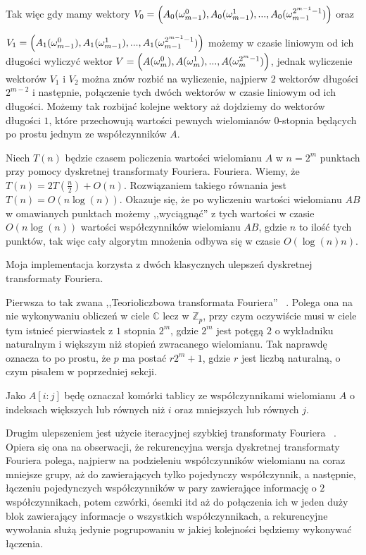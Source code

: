 \documentclass{article}
\begin{document}
Tak więc gdy mamy wektory $V_0=\Bigl( A_0(\omega_{m-1}^0),A_0(\omega_{m-1}^1),...,A_0(\omega_{m-1}^{2^{m-1}-1})\Bigr)$ oraz                          

$V_1=\Bigl( A_1(\omega_{m-1}^0),A_1(\omega_{m-1}^1),...,A_1(\omega_{m-1}^{2^{m-1}-1})\Bigr)$ możemy
w czasie liniowym od ich długości wyliczyć wektor $V=\Bigl( A(\omega_{m}^0),A(\omega_{m}^1),...,A(\omega_{m}^{2^{m}-1})\Bigr)$, jednak wyliczenie wektorów 
$V_1$ i $V_2$ można znów rozbić na wyliczenie, najpierw $2$ wektorów długości $2^{m-2}$ i 
następnie, połączenie tych dwóch wektorów w czasie liniowym od ich długości. Możemy tak rozbijać kolejne wektory aż dojdziemy do wektorów długości
$1$, które przechowują wartości pewnych wielomianów $0$-stopnia będących po prostu jednym ze współczynników $A$.

Niech $T(n)$ będzie czasem policzenia wartości wielomianu $A$ w $n=2^m$ punktach przy pomocy dyskretnej transformaty Fouriera. 
Fouriera. Wiemy, że $T(n)=2T(\frac{n}{2})+O(n)$. Rozwiązaniem takiego równania jest $T(n)=O(n\log(n))$.
Okazuje się, że po wyliczeniu wartości wielomianu $AB$ w omawianych punktach możemy ,,wyciągnąć'' z tych wartości w czasie
$O(n\log(n))$ wartości współczynników wielomianu $AB$, gdzie $n$ to ilość tych punktów, tak więc cały algorytm mnożenia odbywa się w czasie $O(\log(n)n)$.

Moja implementacja korzysta z dwóch klasycznych ulepszeń dyskretnej transformaty Fouriera. 

Pierwsza to tak zwana ,,Teorioliczbowa transformata Fouriera'' ~\cite{garg2017digital}. Polega ona na nie wykonywaniu obliczeń w ciele $\mathbb{C}$ lecz
w $\mathbb{Z}_p$, przy czym oczywiście musi w ciele tym istnieć pierwiastek z $1$ stopnia $2^m$, gdzie $2^m$ jest potęgą $2$ o wykładniku
naturalnym i większym niż stopień zwracanego wielomianu. 
Tak naprawdę oznacza to po prostu, że $p$ ma postać $r2^m+1$, gdzie $r$ jest liczbą naturalną, o czym pisałem w poprzedniej 
sekcji.

Jako $A[i:j]$ będę oznaczał komórki tablicy ze współczynnikami wielomianu $A$ o indeksach większych lub równych niż $i$ oraz mniejszych lub równych $j$. 


Drugim ulepszeniem jest użycie iteracyjnej szybkiej transformaty Fouriera ~\cite{wyrowski1988iterative}. Opiera się ona na obserwacji, że rekurencyjna wersja dyskretnej transformaty Fouriera 
polega, najpierw na podzieleniu współczynników wielomianu na coraz mniejsze grupy, aż do zawierających tylko pojedynczy współczynnik, a następnie, łączeniu pojedynczych współczynników
w pary zawierające informację o $2$ współczynnikach, potem czwórki, ósemki itd aż do połączenia ich w jeden duży blok zawierający informacje o wszystkich współczynnikach, a rekurencyjne wywołania służą jedynie 
pogrupowaniu w jakiej kolejności będziemy wykonywać łączenia.
\end{document}
